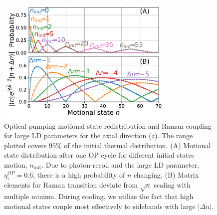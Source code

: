 \documentclass[aps,prl,twocolumn,groupedaddress]{revtex4-1}
\begin{document}
\begin{figure}[b]
  \includegraphics[width=8.5cm]{imgs/fig2_raman_op.pdf}
  \caption{Optical pumping motional-state redistribution and Raman coupling for large LD parameters for the axial direction ($z$). The range plotted covers $95$\% of the initial thermal distribution.
    (A) Motional state distribution %
    after one OP cycle
    for different initial states motion, $n_{\textrm{init}}$. Due to photon-recoil and the large LD parameter, $\eta^{OP}_z=0.6$,
    there is a high probability of $n$ changing.         (B) Matrix elements for Raman transition deviate from
    $\sqrt{n}$ scaling with multiple minima. During cooling, we utilize the fact that high motional states couple most effectively to sidebands with large $|\Delta n|$.
    \label{f-ld}}
\end{figure}


\end{document}
